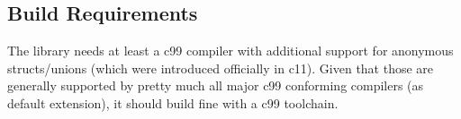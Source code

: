 

\subsection{Build Requirements}

The library needs at least a c99 compiler with additional support for anonymous
structs/unions (which were introduced officially in c11). Given that those are
generally supported by pretty much all major c99 conforming compilers (as
default extension), it should build fine with a c99 toolchain.


